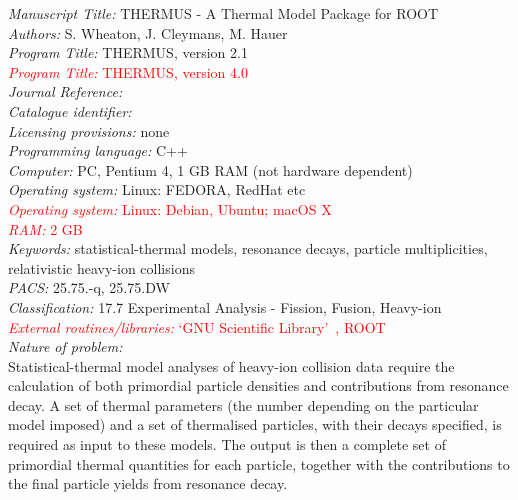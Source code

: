 \documentclass{elsarticle}
\newcounter{bla}
\begin{document}
\begin{small}
\noindent
{\em Manuscript Title:} THERMUS - A Thermal Model Package for ROOT				\\
{\em Authors:} S. Wheaton, J. Cleymans, M. Hauer								\\
{\em Program Title:} THERMUS, version 2.1									\\
\textcolor{red}{{\em Program Title:} THERMUS, version 4.0}						\\
{\em Journal Reference:}													\\
{\em Catalogue identifier:}													\\
{\em Licensing provisions:} none											\\
{\em Programming language:} C++											\\
{\em Computer:} PC, Pentium 4, 1 GB RAM (not hardware dependent)				\\
{\em Operating system:} Linux: FEDORA, RedHat etc							\\
\textcolor{red}{{\em Operating system:} Linux: Debian, Ubuntu; macOS X }			\\
\textcolor{red}{{\em RAM: } 2 GB }											\\
{\em Keywords:} statistical-thermal models, resonance decays, particle multiplicities, 
relativistic heavy-ion collisions												\\
{\em PACS:} 25.75.-q, 25.75.DW											\\
{\em Classification:} 17.7 Experimental Analysis - Fission, Fusion, Heavy-ion			\\
\textcolor{red}{{\em External routines/libraries:} `GNU Scientific Library'~\cite{Galassi:2009gsl}, ROOT~\cite{Brun:1997pa}}	\\

{\em Nature of problem:}\\

Statistical-thermal model analyses of heavy-ion collision data require the
calculation of both primordial particle densities and contributions from 
resonance decay. A set of thermal parameters 
(the number depending on the particular model imposed) and a set of thermalised 
particles, with their decays specified, is required as input to these models. The 
output is then a complete set of primordial thermal quantities for each particle, 
together with the contributions to the final particle yields from resonance decay.\\ 


\end{small}
\end{document}
